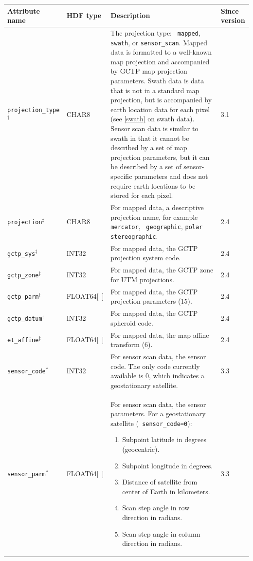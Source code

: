 \begin{tabular}{|l|l|p{7.5cm}|l|}

  \hline

  Attribute name & HDF type & Description & Since version \\ \hline

  {\tt projection\_type} $^{\dagger}$ & CHAR8 & The projection type: {\tt
  mapped}, {\tt swath}, or {\tt sensor\_scan}. Mapped data is
  formatted to a well-known map projection and accompanied by GCTP map
  projection parameters. Swath data is data that is not in a standard
  map projection, but is accompanied by earth location data for each
  pixel (see \autoref{swath} on swath data). Sensor scan data is similar
  to swath in that it cannot be described by a set of map projection
  parameters, but it can be described by a set of sensor-specific
  parameters and does not require earth locations to be stored for
  each pixel. & 3.1 \\ \hline

  {\tt projection}$^{\ddagger}$ & CHAR8 & For mapped data, a
  descriptive projection name, for example {\tt mercator}, {\tt
  geographic}, {\tt polar stereographic}. & 2.4 \\ \hline

  {\tt gctp\_sys}$^{\ddagger}$ & INT32 & For mapped data, the GCTP
  projection system code. & 2.4 \\ \hline

  {\tt gctp\_zone}$^{\ddagger}$ & INT32 & For mapped data, the GCTP
  zone for UTM projections. & 2.4 \\ \hline
  
  {\tt gctp\_parm}$^{\ddagger}$ & FLOAT64[~] & For mapped data, the
  GCTP projection parameters (15). & 2.4 \\ \hline

  {\tt gctp\_datum}$^{\ddagger}$ & INT32 & For mapped data, the GCTP
  spheroid code. & 2.4 \\ \hline

  {\tt et\_affine}$^{\ddagger}$ & FLOAT64[~] & For mapped data, the map
  affine transform (6). & 2.4 \\ \hline

  {\tt sensor\_code}$^{\ast}$ & INT32 & For sensor scan data, the
  sensor code. The only code currently available is 0, which indicates
  a geostationary satellite. & 3.3 \\ \hline

  {\tt sensor\_parm}$^{\ast}$ & FLOAT64[~] & For sensor scan data, the
  sensor parameters. For a geostationary satellite ({\tt
  sensor\_code=0}):
  \begin{enumerate}
    \item Subpoint latitude in degrees (geocentric).
    \item Subpoint longitude in degrees.
    \item Distance of satellite from center of Earth in kilometers.
    \item Scan step angle in row direction in radians.
    \item Scan step angle in column direction in radians.
  \end{enumerate}
  & 3.3 \\ \hline 


\end{tabular}
